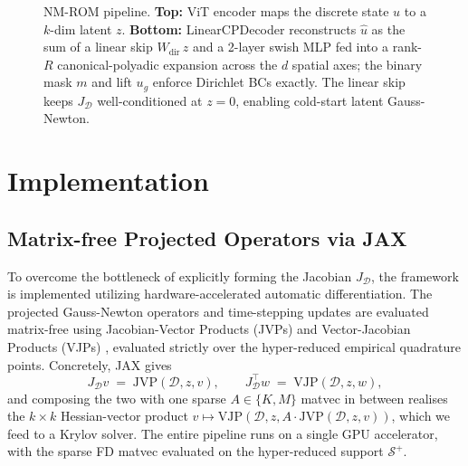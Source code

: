 \documentclass{article}
\begin{document}
\begin{figure}[!htbp]
{}                                                                                     
    \caption{NM-ROM pipeline. \textbf{Top:} ViT encoder maps the
      discrete state $u$ to a $k$-dim latent $z$. \textbf{Bottom:}                                                  
      LinearCPDecoder reconstructs $\hat u$ as the sum of a linear skip                                    
      $W_\mathrm{dir}\,z$ and a 2-layer swish MLP fed into a rank-$R$                                      
      canonical-polyadic expansion across the $d$ spatial axes; the                                        
      binary mask $m$ and lift $u_g$ enforce Dirichlet BCs exactly. The                                    
      linear skip keeps $J_\mathcal{D}$ well-conditioned at $z=0$,                                         
      enabling cold-start latent Gauss-Newton.}                                                            
    \label{fig:arch}                                                                                       
  \end{figure}                                                                                             
\section{Implementation}
\label{sec:impl}

\subsection{Matrix-free Projected Operators via JAX}

To overcome the bottleneck of explicitly forming the Jacobian
$J_\mathcal{D}$, the framework is implemented utilizing
hardware-accelerated automatic differentiation. The projected
Gauss-Newton operators and time-stepping updates are evaluated
matrix-free using Jacobian-Vector Products (JVPs) and Vector-Jacobian
Products (VJPs) \citep{Bradbury2018JAX}, evaluated strictly over the
hyper-reduced empirical quadrature points. Concretely, JAX gives
\[
  J_\mathcal{D} v \;=\; \mathrm{JVP}(\mathcal{D}, z, v),
  \qquad
  J_\mathcal{D}^\top w \;=\; \mathrm{VJP}(\mathcal{D}, z, w),
\]
and composing the two with one sparse $A \in \{K, M\}$ matvec in
between realises the $k \times k$ Hessian-vector product
$v \mapsto \mathrm{VJP}(\mathcal{D}, z,
A \cdot \mathrm{JVP}(\mathcal{D}, z, v))$,
which we feed to a Krylov solver. The entire pipeline runs on a single
GPU accelerator, with the sparse FD matvec evaluated on the
hyper-reduced support $\mathcal{S}^+$.
\end{document}

